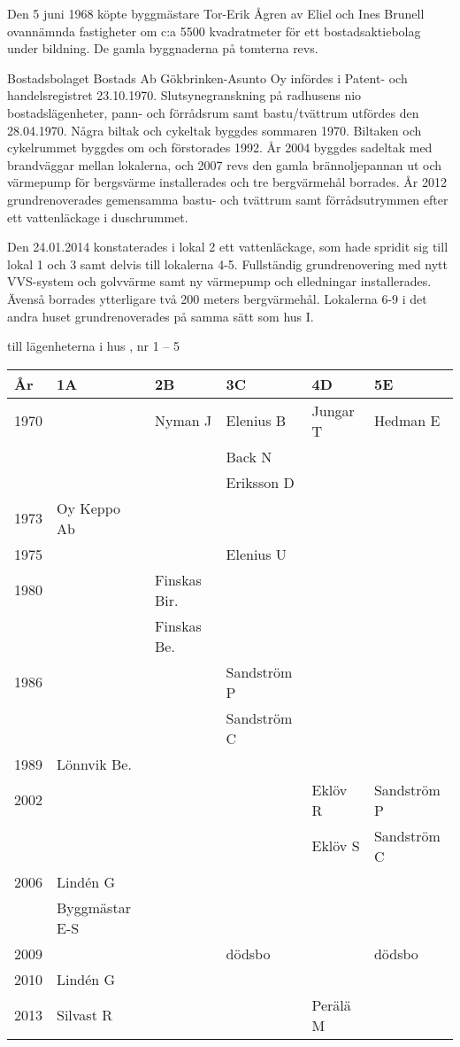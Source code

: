Den 5 juni 1968 köpte byggmästare Tor-Erik Ågren av Eliel och Ines Brunell ovannämnda fastigheter om c:a 5500 kvadratmeter för ett bostadsaktiebolag under bildning. De gamla byggnaderna på tomterna revs.

Bostadsbolaget Bostads Ab Gökbrinken-Asunto Oy infördes i Patent- och handelsregistret 23.10.1970. Slutsynegranskning på radhusens nio bostadslägenheter, pann- och förrådsrum samt bastu/tvättrum utfördes den 28.04.1970. Några biltak och cykeltak byggdes sommaren 1970. Biltaken och cykelrummet byggdes om och förstorades 1992. År 2004 byggdes sadeltak med brandväggar mellan lokalerna, och 2007 revs den gamla brännoljepannan ut och värmepump för bergsvärme installerades och tre bergvärmehål borrades. År 2012 grundrenoverades gemensamma bastu- och tvättrum samt förrådsutrymmen efter ett vattenläckage i duschrummet.


Den 24.01.2014 konstaterades i lokal 2 ett vattenläckage, som hade spridit sig till lokal 1 och 3 samt delvis till lokalerna 4-5. Fullständig grundrenovering med nytt VVS-system och golvvärme samt ny värmepump och elledningar installerades. Ävenså borrades ytterligare två 200 meters bergvärmehål. Lokalerna 6-9 i det andra huset grundrenoverades på samma sätt som hus I.

 till lägenheterna i hus , nr 1 – 5
\begin{center}
  \begin{tabular}{l l l l l l}
    År & 1A & 2B & 3C & 4D & 5E \\ \hline
    1970 &  & Nyman J & Elenius B & Jungar T & Hedman E \\
      &  &  & Back N &  &  \\
      &  &  & Eriksson D &  &  \\
    1973 & Oy Keppo Ab &   &   &   &   \\
    1975 &   &   & Elenius U &   &   \\
    1980 &   & Finskas Bir. &   &   &   \\
      &   & Finskas Be. &   &   &   \\
    1986 &   &   & Sandström P &   &   \\
      &   &   & Sandström C &   &   \\
    1989 & Lönnvik Be. &   &   &   &   \\
    2002 &   &   &   & Eklöv R & Sandström P \\
      &   &   &   & Eklöv S & Sandström C \\
    2006 & Lindén G &   &   &   &   \\
      & Byggmästar E-S &   &   &   &   \\
    2009 &   &   & dödsbo &   & dödsbo \\
    2010 & Lindén G &   &   &   &   \\
    2013 & Silvast R &   &   & Perälä M &   \\
  \end{tabular}
\end{center}



